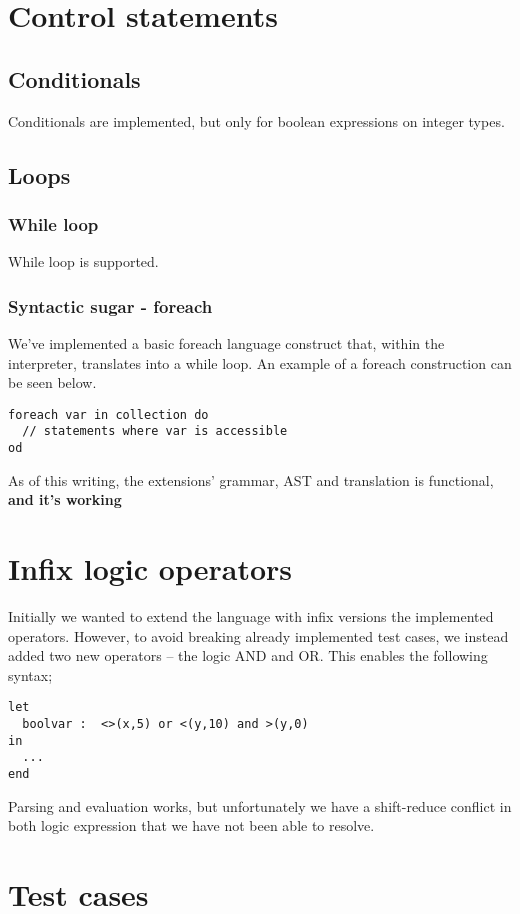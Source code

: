 \documentclass[10pt]{scrartcl}
\begin{document}
\section{Control statements}
\subsection{Conditionals}
Conditionals are implemented, but only for boolean expressions on integer types.
\subsection{Loops}
\subsubsection{While loop}
While loop is supported. 
\subsubsection{Syntactic sugar - foreach}
We've implemented a basic foreach language construct that, within the interpreter, translates into a while loop. An example of a foreach construction can be seen below.
  \begin{lstlisting}
foreach var in collection do
  // statements where var is accessible
od
 \end{lstlisting}
 As of this writing, the extensions' grammar, AST and translation is functional, \textbf{and it's working}
\section{Infix logic operators}
Initially we wanted to extend the language with infix versions the implemented operators. However, to avoid breaking already implemented test cases, we instead added two new operators -- the logic AND and OR. This enables the following syntax;
\begin{lstlisting}
let
  boolvar :  <>(x,5) or <(y,10) and >(y,0)
in
  ...
end
\end{lstlisting}
Parsing and evaluation works, but unfortunately we have a shift-reduce conflict in both logic expression that we have not been able to resolve.
\section{Test cases}
\end{document}
